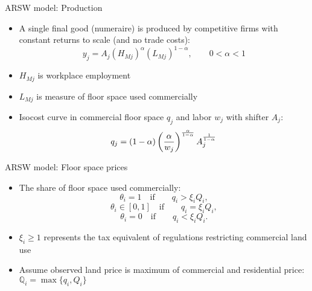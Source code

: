 \documentclass[11pt,notes=hide,aspectratio=169]{beamer}
\begin{document}
\begin{frame}{ARSW model: Production}
\begin{itemize}
\item A single final good (numeraire) is produced by competitive firms with constant returns to scale (and no trade costs):
\[
y_{j} = A_{j} \left( H_{Mj} \right)^{\alpha} \left( L_{Mj} \right)^{1-\alpha},\qquad 0<\alpha <1
\]
\item $H_{Mj}$ is workplace employment 
\item $L_{Mj}$ is measure of floor space used commercially
\item Isocost curve in commercial floor space $q_j$ and labor $w_j$ with shifter $A_j$:
\begin{equation*} \label{eq:zp}
q_{j}=(1-\alpha )\left( \frac{\alpha }{w_{j}}\right) ^{\frac{\alpha }{%
1-\alpha }}A_{j}^{\frac{1}{1-\alpha }}
\end{equation*}
\end{itemize}
\end{frame}
\begin{frame}{ARSW model: Floor space prices}
\begin{itemize}
\item The share of floor space used commercially:
\begin{equation*} \label{eq_na}
\theta_i = 1 \quad \text{if} \qquad q_i> \xi_i Q_i,
\end{equation*}
\[
\theta_i \in [0,1] \quad  \text{if} \qquad q_i = \xi_i Q_i,
\]
\[
\theta_i = 0 \quad  \text{if} \qquad q_i < \xi_i Q_i.
\]
\item $\xi_i \geq 1$ represents the tax equivalent of regulations restricting commercial land use
\item Assume observed land price is maximum of commercial and residential price: $\mathbb{Q}_{i} = \max\{q_i,Q_i\}$
\end{itemize}
\end{frame}
\end{document}
